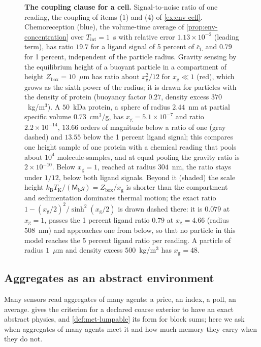 \begin{figure}[!t]
  \centering
  
  \caption{\textbf{The coupling clause for a cell.} Signal-to-noise ratio of one reading, the coupling of items (1) and (4) of \cref{ex:env-cell}. Chemoreception (blue), the volume-time average of \cref{prop:env-concentration} over $T_{\mathrm{int}}=1$~s with relative error $1.13\times10^{-2}$ (leading term), has ratio $19.7$ for a ligand signal of 5 percent of $\bar c_{\mathrm L}$ and $0.79$ for 1 percent, independent of the particle radius. Gravity sensing by the equilibrium height of a buoyant particle in a compartment of height $Z_{\mathrm{box}}=10$~$\mu$m has ratio about $x_{\mathrm g}^2/12$ for $x_{\mathrm g}\ll1$ (red), which grows as the sixth power of the radius; it is drawn for particles with the density of protein (buoyancy factor $0.27$, density excess $370$~kg/m$^3$). A $50$~kDa protein, a sphere of radius $2.44$~nm at partial specific volume $0.73$~cm$^3$/g, has $x_{\mathrm g}=5.1\times10^{-7}$ and ratio $2.2\times10^{-14}$, $13.66$ orders of magnitude below a ratio of one (gray dashed) and $13.55$ below the 1 percent ligand signal; this compares one height sample of one protein with a chemical reading that pools about $10^4$ molecule-samples, and at equal pooling the gravity ratio is $2\times10^{-10}$. Below $x_{\mathrm g}=1$, reached at radius $304$~nm, the ratio stays under $1/12$, below both ligand signals. Beyond it (shaded) the scale height $k_{\mathrm B}T_{\mathrm K}/(\mathsf M_{\mathrm b}g)=Z_{\mathrm{box}}/x_{\mathrm g}$ is shorter than the compartment and sedimentation dominates thermal motion; the exact ratio $1-(x_{\mathrm g}/2)^2/\sinh^2(x_{\mathrm g}/2)$ is drawn dashed there: it is $0.079$ at $x_{\mathrm g}=1$, passes the 1 percent ligand ratio $0.79$ at $x_{\mathrm g}=4.66$ (radius $508$~nm) and approaches one from below, so that no particle in this model reaches the 5 percent ligand ratio per reading. A particle of radius $1$~$\mu$m and density excess $500$~kg/m$^3$ has $x_{\mathrm g}=48$.}
  \label{fig:env-cell}
\end{figure}

\subsection{Aggregates as an abstract environment}\label{sec:env-aggregates}

Many sensors read aggregates of many agents: a price, an index, a poll, an average.  gives the criterion for a declared coarse exterior to have an exact abstract physics, and \cref{def:met-lumpable} its form for block sums; here we ask when aggregates of many agents meet it and how much memory they carry when they do not.

